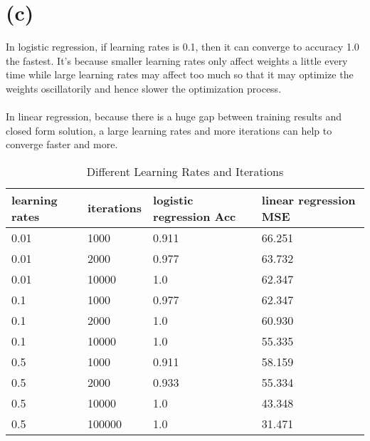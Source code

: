 \documentclass[12pt,a4paper]{article}
\begin{document}
\section*{(c)}
In logistic regression, if learning rates is 0.1, then it can converge to accuracy 1.0 the fastest. It's because smaller learning rates only affect weights a little every time while
large learning rates may affect too much so that it may optimize the weights oscillatorily and hence slower the optimization process.\\
\\
In linear regression, because there is a huge gap between training results and closed form solution, a large learning rates and more iterations can help to converge faster and more.

\begin{table}[htbp]
    \centering
    \caption{Different Learning Rates and Iterations}
    \label{label3}
    \begin{tabular}[t]{llll}
    \hline
    learning rates & iterations &logistic regression Acc & linear regression MSE\\
    \hline
    0.01 & 1000 & 0.911 & 66.251 \\
    0.01 & 2000 & 0.977 & 63.732 \\
    0.01 & 10000 & 1.0 & 62.347 \\
    0.1 & 1000 & 0.977 & 62.347 \\
    0.1 & 2000 & 1.0 & 60.930 \\
    0.1 & 10000 & 1.0 & 55.335 \\
    0.5 & 1000 & 0.911 & 58.159 \\
    0.5 & 2000 & 0.933 & 55.334 \\
    0.5 & 10000 & 1.0 & 43.348 \\
    0.5 & 100000 & 1.0 & 31.471 \\
    \hline
    \end{tabular}
\end{table}
\newpage
\end{document}
